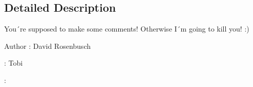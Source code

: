\subsection{Detailed Description}
You´re supposed to make some comments! Otherwise I´m going to kill you! \+:)

\begin{DoxyAuthor}{Author}
\+: David Rosenbusch

\+: Tobi 

\+: 
\end{DoxyAuthor}

